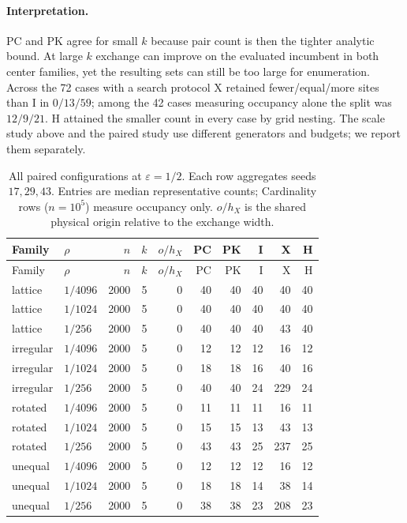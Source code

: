 \documentclass[a4paper,12pt]{article}
\numberwithin{equation}{section}
\begin{document}
\paragraph{Interpretation.}
PC and PK agree for small $k$ because pair count is then the tighter analytic bound. At large $k$
exchange can improve on the evaluated incumbent in both center families, yet the resulting sets
can still be too large for enumeration. Across the 72 cases with a search protocol X retained fewer/equal/more sites
than I in $0/13/59$; among the 42 cases measuring occupancy alone the split was $12/9/21$. H attained the smaller count in every case by grid nesting. The scale
study above and the paired study use different generators and budgets; we report them separately.
\small
\begin{longtable}{@{}llrrrrrrrr@{}}
\caption{All paired configurations at $\varepsilon=1/2$. Each row aggregates seeds $17,29,43$. Entries are median representative counts; Cardinality rows ($n=10^5$) measure occupancy only. $o/h_X$ is the shared physical origin relative to the exchange width.}\label{tab:paired-all}\\
\toprule Family & $\rho$ & $n$ & $k$ & $o/h_X$ & PC & PK & I & X & H\\\midrule\endfirsthead
\toprule Family & $\rho$ & $n$ & $k$ & $o/h_X$ & PC & PK & I & X & H\\\midrule\endhead
lattice & $1/4096$ & 2000 & 5 & $0$ & 40 & 40 & 40 & 40 & 40\\
lattice & $1/1024$ & 2000 & 5 & $0$ & 40 & 40 & 40 & 40 & 40\\
lattice & $1/256$ & 2000 & 5 & $0$ & 40 & 40 & 40 & 43 & 40\\
irregular & $1/4096$ & 2000 & 5 & $0$ & 12 & 12 & 12 & 16 & 12\\
irregular & $1/1024$ & 2000 & 5 & $0$ & 18 & 18 & 16 & 40 & 16\\
irregular & $1/256$ & 2000 & 5 & $0$ & 40 & 40 & 24 & 229 & 24\\
rotated & $1/4096$ & 2000 & 5 & $0$ & 11 & 11 & 11 & 16 & 11\\
rotated & $1/1024$ & 2000 & 5 & $0$ & 15 & 15 & 13 & 43 & 13\\
rotated & $1/256$ & 2000 & 5 & $0$ & 43 & 43 & 25 & 237 & 25\\
unequal & $1/4096$ & 2000 & 5 & $0$ & 12 & 12 & 12 & 16 & 12\\
unequal & $1/1024$ & 2000 & 5 & $0$ & 18 & 18 & 14 & 38 & 14\\
unequal & $1/256$ & 2000 & 5 & $0$ & 38 & 38 & 23 & 208 & 23\\

\end{longtable}
\end{document}
